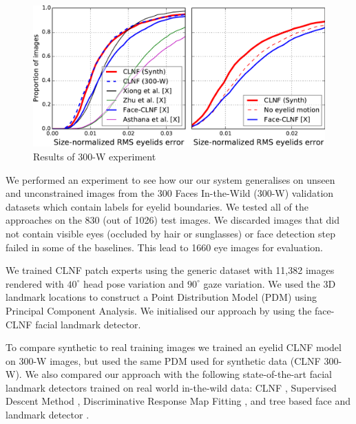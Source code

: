 \begin{figure}
    \centering
    \includegraphics[width=\columnwidth]{figs/CLNF_300W_experiment.pdf}
    \caption{Results of 300-W experiment}
    \label{fig:clnf_results_wild}
\end{figure}



We performed an experiment to see how our our system generalises on unseen and unconstrained images from the 300 Faces In-the-Wild (300-W) \cite{sagonas2013300} validation datasets which contain labels for eyelid boundaries. We tested all of the approaches on the 830 (out of 1026) test images. We discarded images that did not contain visible eyes (occluded by hair or sunglasses) or face detection step failed in some of the baselines. This lead to 1660 eye images for evaluation.

We trained CLNF patch experts using the generic \dataset dataset with 11,382 images rendered with $40^{\circ}$ head pose variation and $90^{\circ}$ gaze variation. 
We used the 3D landmark locations to construct a Point Distribution Model (PDM) using Principal Component Analysis. 
We initialised our approach by using the face-CLNF \cite{baltrusaitis2013constrained} facial landmark detector.

To compare synthetic to real training images we trained an eyelid CLNF model on 300-W images, but used the same PDM used for synthetic data (CLNF 300-W). 
We also compared our approach with the following state-of-the-art facial landmark detectors trained on real world in-the-wild data: CLNF \cite{baltrusaitis2013constrained}, Supervised Descent Method \cite{Xiong2013sdm}, Discriminative Response Map Fitting \cite{Asthana2013drmf}, and tree based face and landmark detector \cite{Zhu2012tree}. 

